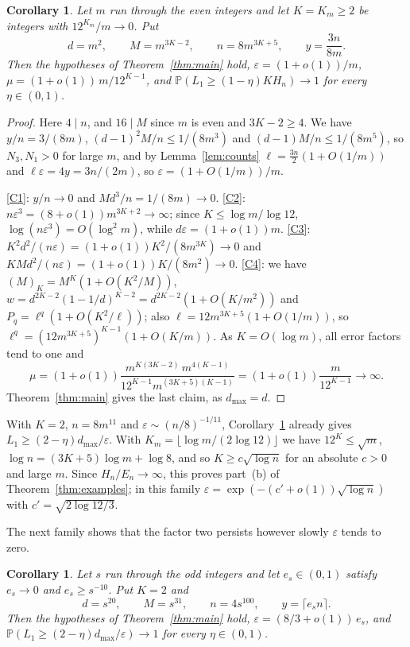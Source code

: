 \documentclass[11pt]{amsart}
\newtheorem{corollary}[theorem]{Corollary}
\theoremstyle{definition}
\theoremstyle{remark}
\numberwithin{equation}{section}
\newcommand{\PP}{\mathbb P}
\newcommand{\eps}{\varepsilon}
\newcommand{\dmax}{d_{\max}}
\begin{document}
\begin{corollary}\label{cor:paths}
Let $m$ run through the even integers and let $K=K_m\ge2$ be integers with $12^{K_m}/m\to0$. Put
\[
d=m^2,\qquad M=m^{3K-2},\qquad n=8m^{3K+5},\qquad y=\frac{3n}{8m}.
\]
Then the hypotheses of Theorem~\ref{thm:main} hold, $\eps=(1+o(1))/m$, $\mu=(1+o(1))\,m/12^{K-1}$, and $\PP(L_1\ge(1-\eta)KH_n)\to1$ for every $\eta\in(0,1)$.
\end{corollary}

\begin{proof}
Here $4\mid n$, and $16\mid M$ since $m$ is even and $3K-2\ge4$. We have $y/n=3/(8m)$, $(d-1)^2M/n\le1/(8m^3)$ and $(d-1)M/n\le1/(8m^5)$, so $N_3,N_1>0$ for large $m$, and by Lemma~\ref{lem:counts} $\ell=\tfrac{3n}{2}(1+O(1/m))$ and $\ell\eps=4y=3n/(2m)$, so $\eps=(1+O(1/m))/m$.

\ref{C1}: $y/n\to0$ and $Md^3/n=1/(8m)\to0$. \ref{C2}: $n\eps^3=(8+o(1))m^{3K+2}\to\infty$; since $K\le\log m/\log12$, $\log(n\eps^3)=O(\log^2m)$, while $d\eps=(1+o(1))m$. \ref{C3}: $K^2d^2/(n\eps)=(1+o(1))K^2/(8m^{3K})\to0$ and $KMd^2/(n\eps)=(1+o(1))K/(8m^2)\to0$. \ref{C4}: we have $(M)_K=M^K(1+O(K^2/M))$, $w=d^{2K-2}(1-1/d)^{K-2}=d^{2K-2}(1+O(K/m^2))$ and $P_q=\ell^q(1+O(K^2/\ell))$; also $\ell=12m^{3K+5}(1+O(1/m))$, so $\ell^q=(12m^{3K+5})^{K-1}(1+O(K/m))$. As $K=O(\log m)$, all error factors tend to one and
\[
\mu=(1+o(1))\frac{m^{K(3K-2)}\,m^{4(K-1)}}{12^{K-1}m^{(3K+5)(K-1)}}=(1+o(1))\frac{m}{12^{K-1}}\to\infty.
\]
Theorem~\ref{thm:main} gives the last claim, as $\dmax=d$.
\end{proof}

With $K=2$, $n=8m^{11}$ and $\eps\sim(n/8)^{-1/11}$, Corollary~\ref{cor:paths} already gives $L_1\ge(2-\eta)\dmax/\eps$. With $K_m=\lfloor\log m/(2\log12)\rfloor$ we have $12^{K}\le\sqrt m$, $\log n=(3K+5)\log m+\log 8$, and so $K\ge c\sqrt{\log n}$ for an absolute $c>0$ and large $m$. Since $H_n/E_n\to\infty$, this proves part~(b) of Theorem~\ref{thm:examples}; in this family $\eps=\exp(-(c'+o(1))\sqrt{\log n})$ with $c'=\sqrt{2\log 12/3}$.

The next family shows that the factor two persists however slowly $\eps$ tends to zero.

\begin{corollary}\label{cor:slow}
Let $s$ run through the odd integers and let $e_s\in(0,1)$ satisfy $e_s\to0$ and $e_s\ge s^{-10}$. Put $K=2$ and
\[
d=s^{20},\qquad M=s^{31},\qquad n=4s^{100},\qquad y=\lceil e_sn\rceil .
\]
Then the hypotheses of Theorem~\ref{thm:main} hold, $\eps=(8/3+o(1))\,e_s$, and $\PP(L_1\ge(2-\eta)\dmax/\eps)\to1$ for every $\eta\in(0,1)$.
\end{corollary}
\end{document}
